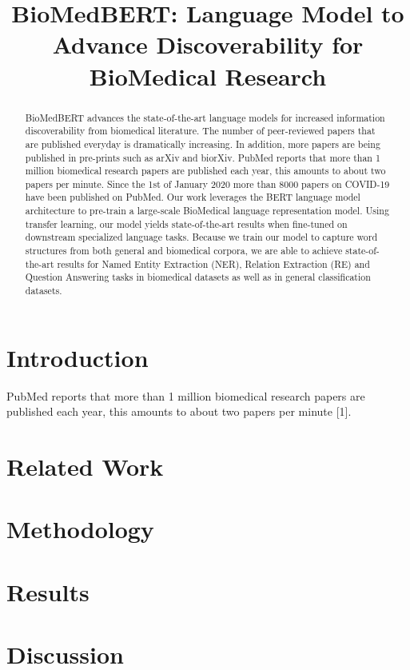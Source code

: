 \documentclass{article}
\title{BioMedBERT: Language Model to Advance Discoverability for BioMedical Research}
\author{
}
\begin{document}
\maketitle
\begin{abstract}
BioMedBERT advances the state-of-the-art language models for increased information discoverability from biomedical literature. The number of peer-reviewed papers that are published everyday is dramatically increasing. In addition, more papers are being published in pre-prints such as arXiv and biorXiv. PubMed reports that more than 1 million biomedical research papers are published each year, this amounts to about two papers per minute. Since the 1st of January 2020 more than 8000 papers on COVID-19 have been published on PubMed. Our work leverages the BERT language model architecture to pre-train a large-scale BioMedical language representation model. Using transfer learning, our model yields state-of-the-art results when fine-tuned on downstream specialized language tasks. Because we train our model to capture word structures from both general and biomedical corpora, we are able to achieve state-of-the-art results for Named Entity Extraction (NER), Relation Extraction (RE) and Question Answering tasks in biomedical datasets as well as in general classification datasets. 
\end{abstract}




\section{Introduction}
PubMed reports that more than 1 million biomedical research papers are published each year, this amounts to about two papers per minute [1].


\section{Related Work}


\section{Methodology}


\section{Results}


\section{Discussion}
\end{document}
